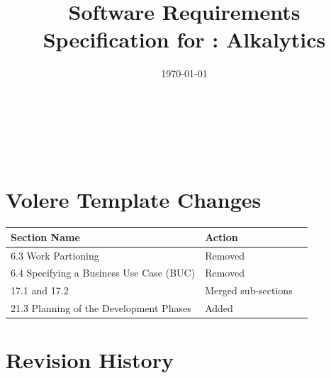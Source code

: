 \documentclass[12pt]{article}
\begin{document}
\title{Software Requirements Specification for \progname: Alkalytics} 
\author{\authname}
\date{\today}
	
\maketitle

~\newpage


\tableofcontents

~\newpage

\listoffigures
\listoftables

\section*{Volere Template Changes}
\begin{tabularx}{\textwidth}{p{8cm}p{4cm}X} \toprule
  {\textbf{Section Name}} & {\textbf{Action}}\\
  \midrule
  6.3 Work Partioning & Removed\\
  6.4 Specifying a Business Use Case (BUC) & Removed\\
  17.1 and 17.2 & Merged sub-sections\\
  21.3 Planning of the Development Phases & Added\\
  \bottomrule
\end{tabularx}

\newpage
\section*{Revision History}
\end{document}
